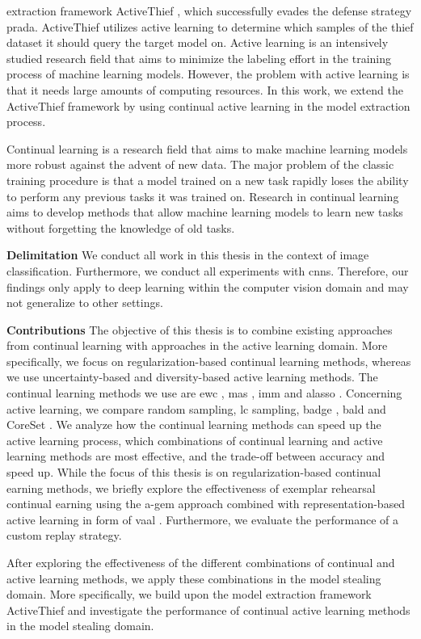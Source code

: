 extraction framework ActiveThief \cite{pal2020activethief}, which successfully evades the defense strategy  \gls{prada}. ActiveThief utilizes active
learning to determine which samples of the thief dataset it should query the target model on. Active learning is an intensively studied research
field that aims to minimize the labeling effort in the training process of machine learning models. However, the problem with active learning is
that it needs large amounts of computing resources. In this work, we extend the ActiveThief framework by using continual active learning in the model
extraction process.\par
Continual learning is a research field that aims to make machine learning models more robust against the advent of new data. The major problem
of the classic training procedure is that a model trained on a new task rapidly loses the ability to perform any previous tasks it was trained on.
Research in continual learning aims to develop methods that allow machine learning models to learn new tasks without forgetting the knowledge of old 
tasks. \par
\textbf{Delimitation} \hspace{0.2cm} We conduct all work in this thesis in the context of image classification. Furthermore, we conduct all experiments
with \glspl{cnn}. Therefore, our findings only apply to deep learning within the computer vision domain and may not generalize to other settings. \par
\textbf{Contributions} \hspace{0.2cm} The objective of this thesis is to combine existing approaches from continual learning
with approaches in the active learning domain. More specifically, we focus on regularization-based continual learning methods,
whereas we use uncertainty-based and diversity-based active learning methods. The continual learning methods we use are \gls{ewc} \cite{kirkpatrick2017overcoming},
\gls{mas} \cite{aljundi2018memory}, \gls{imm} \cite{lee2017overcoming} and \gls{alasso} \cite{park2019continual}.
Concerning active learning, we compare random sampling, \gls{lc} \cite{lewis1995sequential} sampling, \gls{badge} \cite{ash2019deep}, \gls{bald} \cite{houlsby2011bayesian} and
CoreSet \cite{sener2017active}.
We analyze how the continual learning methods can speed up the active learning process, which combinations of continual learning and active learning methods
are most effective, and the trade-off between accuracy and speed up. While the focus of this thesis is on regularization-based continual
earning methods, we briefly explore the effectiveness of exemplar rehearsal continual earning using the \gls{a-gem} approach \cite{chaudhry2018efficient}
combined with representation-based active learning in form of \gls{vaal} \cite{sinha2019variational}. Furthermore, we evaluate the performance of a custom replay strategy.\par
After exploring the effectiveness of the different combinations of continual and active learning methods, we apply these combinations in the model stealing
domain. More specifically, we build upon the model extraction framework ActiveThief \cite{pal2020activethief} and investigate the performance of continual
active learning methods in the model stealing domain.